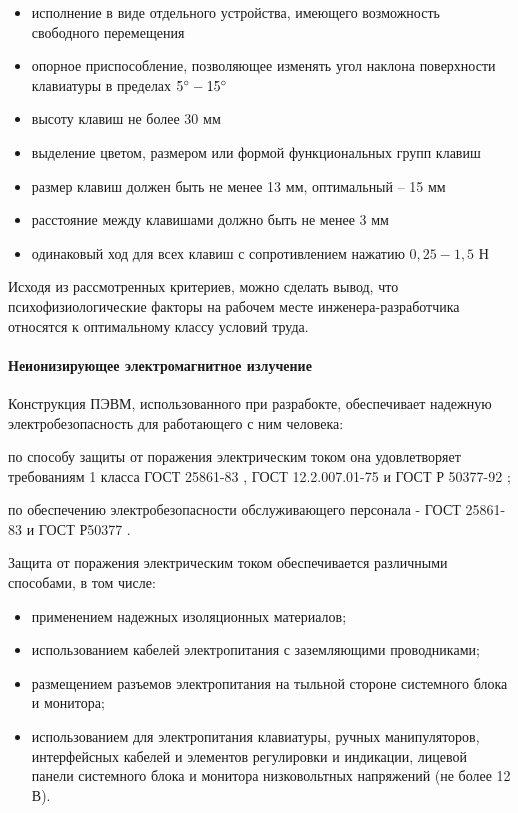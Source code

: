 \begin{itemize}
    \item исполнение в виде отдельного устройства, имеющего возможность свободного
            перемещения
    \item опорное приспособление, позволяющее изменять угол наклона поверхности
            клавиатуры в пределах $5 \degree - 15 \degree$
    \item высоту клавиш не более 30 мм
    \item выделение цветом, размером или формой функциональных групп клавиш
    \item размер клавиш должен быть не менее 13 мм, оптимальный – 15 мм
    \item расстояние между клавишами должно быть не менее 3 мм
    \item одинаковый ход для всех клавиш с сопротивлением нажатию $0,25 - 1,5$ Н
\end{itemize}

Исходя из рассмотренных критериев, можно сделать вывод, что психофизиологические
факторы на рабочем месте инженера-разработчика относятся к оптимальному классу
условий труда.

\paragraph{Неионизирующее электромагнитное излучение}

Конструкция ПЭВМ, использованного при разрабокте, обеспечивает надежную
электробезопасность для работающего с ним человека:

по способу защиты от поражения электрическим током она удовлетворяет требованиям
1 класса ГОСТ 25861-83 \cite{ecology_gost_25861_83}, ГОСТ 12.2.007.01-75
\cite{ecology_gost_12_2_007_01_75} и ГОСТ Р 50377-92 \cite{ecology_gost_50377_92};

по обеспечению электробезопасности обслуживающего персонала - ГОСТ 25861-83
\cite{ecology_gost_25861_83} и ГОСТ Р50377 \cite{ecology_gost_50377_92}.

Защита от поражения электрическим током обеспечивается различными способами,
в том числе:

\begin{itemize}
    \item применением надежных изоляционных материалов;
    \item использованием кабелей электропитания с заземляющими проводниками;
    \item размещением разъемов электропитания на тыльной стороне системного блока
            и монитора;
    \item использованием для электропитания клавиатуры, ручных манипуляторов,
            интерфейсных кабелей и элементов регулировки и индикации, лицевой панели системного блока и монитора низковольтных напряжений (не более 12 В).
\end{itemize}

